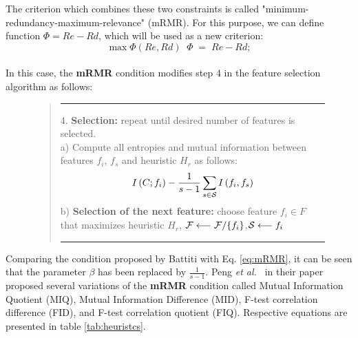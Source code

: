 \documentclass[a4paper,fleqn]{report}
\def\etal{{\em et al.\ }}
\newcommand\cF{{\cal F}}
\newcommand\cS{{\cal S}}
\begin{document}
The criterion which combines these two constraints is called "minimum-redundancy-maximum-relevance" (mRMR). For this purpose,
we can define function $\Phi = Re - Rd $, which will be used as a new criterion:
\begin{equation}\label{eq:minredmaxrel}
\max \Phi \left( Re, Rd \right)\;\; \Phi\;=\;Re-Rd;
\end{equation}
\\
In this case, the {\bf mRMR} condition modifies step 4 in the feature selection algorithm as follows:
\ \\
\begin{figure}[ht] \label{it:quote:minredmacrel}
\vspace*{-0.4cm}
\centering
\begin{quote}
\hrule width 5.6 in
\vspace{0.2cm}
4. {\bf Selection:} repeat until desired number of features is selected. \\
  a) Compute all entropies and mutual information between features $f_i$, $f_s$ and heuristic $H_r$ as follows: \\
      \begin{equation} \label{eq:mRMR} I \left(C; f_i \right) - \frac{1}{s-1} \sum_{s \in \cS} I \left(f_i ,f_s \right) \end{equation}
  b) {\bf Selection of the next feature:} choose feature $f_i \in F$ that maximizes heuristic $H_r$, $ \cF \longleftarrow \cF / \{f_i\}$,$ \cS \longleftarrow {f_i} $
 \vspace{0.2cm}
 \hrule width 5.6 in
\end{quote}
\end{figure}

Comparing the condition proposed by Battiti \cite{Battiti1994} with Eq. \ref{eq:mRMR}, it can be seen that
the parameter $\beta$ has been replaced by $\frac{1}{s-1}$. Peng \etal \cite{Peng2005a} in their paper proposed several variations
of the {\bf mRMR} condition called Mutual Information Quotient (MIQ), Mutual Information Difference (MID), 
F-test correlation difference (FID), and F-test correlation quotient (FIQ).
Respective equations are presented in table \ref{tab:heuristcs}. 
\end{document}
